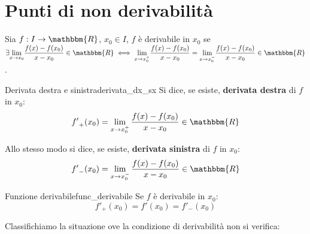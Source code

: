 \documentclass[12pt]{report}
\newcounter{definition}
\newcommand{\nmu}{}
\begin{document}
 	\section{Punti di non derivabilità}
 	Sia $f: I \to \mathbbm{R}$, $x_0 \in I$, $f$ è derivabile in $x_0$ se $\exists \mathlarger{\lim_{x \to {x_0}}}\dfrac{f(x) - f(x_0)}{x - x_0} \in \mathbbm{R} \iff \mathlarger{\lim_{x \to {x_0^+}}}\dfrac{f(x) - f(x_0)}{x - x_0} = \mathlarger{\lim_{x \to {x_0^-}}}\dfrac{f(x) - f(x_0)}{x - x_0} \in \mathbbm{R}$.
 	\begin{definition}{\nmu Derivata destra e sinistra}{derivata_dx_sx}
 		Si dice, se esiste, \textbf{derivata destra} di $f$ in $x_0$:
 		\[
 		{f'}_+(x_0) = \lim_{x \to {x_0^+}}\dfrac{f(x) - f(x_0)}{x - x_0} \in \mathbbm{R}
 		\]

 		Allo stesso modo si dice, se esiste, \textbf{derivata sinistra} di $f$ in $x_0$:
 		\[
 		{f'}_-(x_0) = \lim_{x \to {x_0^-}}\dfrac{f(x) - f(x_0)}{x - x_0} \in \mathbbm{R}
 		\]
 	\end{definition}
 	\begin{note}{\nmu Funzione derivabile}{func_derivabile}
 		Se $f$ è derivabile in $x_0$:
 		\[
 		{f'}_+(x_0) = f'(x_0) = {f'}_-(x_0)
 		\]
 	\end{note}
 	Classifichiamo la situazione ove la condizione di derivabilità non si verifica:
\end{document}
